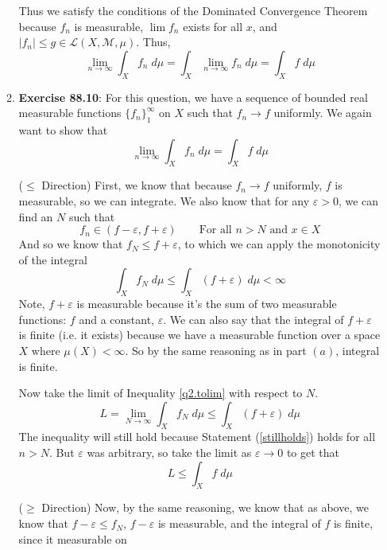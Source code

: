 \documentclass[12pt]{article}
\theoremstyle{plain}
\theoremstyle{definition}
\theoremstyle{remark}
\begin{document}
\begin{enumerate}
\begin{enumerate}
Thus we satisfy the conditions of the Dominated Convergence Theorem because $f_n$ is measurable, $\lim f_n$ exists for all $x$, and $|f_n|\leq g\in\mathscr{L}(X,\mathscr{M},\mu)$. Thus, 
\[
  \lim_{n\rightarrow\infty} \int_X f_n \; d\mu  
  = \int_X \lim_{n\rightarrow\infty} f_n \; d\mu
  = \int_X  f \; d\mu
\]

\item \textbf{Exercise 88.10}: For this question, we have a sequence of bounded real measurable functions $\{f_n\}^\infty_1$ on $X$ such that $f_n\rightarrow f$ uniformly. We again want to show that 
\begin{equation}
    \lim_{n\rightarrow\infty} \int_X f_n \; d\mu
    = \int_X f \; d\mu
\end{equation}
    
($\leq$ Direction) First, we know that because $f_n\rightarrow f$ uniformly, $f$ is measurable, so we can integrate. We also know that for any $\varepsilon>0$, we can find an $N$ such that 
\begin{equation}
    \label{stillholds}
    f_n \in (f-\varepsilon, f+\varepsilon) 
    \qquad \text{For all $n>N$ and $x\in X$}
\end{equation}
And so we know that $f_N\leq f+\varepsilon$, to which we can apply the monotonicity of the integral
\begin{equation}
    \label{q2.tolim}
    \int_X f_N \; d\mu \leq \int_X (f+\varepsilon) \; d\mu
    <\infty
\end{equation}
Note, $f+\varepsilon$ is measurable because it's the sum of two measurable functions: $f$ and a constant, $\varepsilon$. We can also say that the integral of $f+\varepsilon$ is finite (i.e. it exists) because we have a measurable function over a space $X$ where $\mu(X)<\infty$. So by the same reasoning as in part $(a)$, integral is finite.

Now take the limit of Inequality \ref{q2.tolim} with respect to $N$. 
\begin{equation}
    L=\lim_{N\rightarrow\infty}
    \int_X f_N \; d\mu \leq \int_X (f+\varepsilon) \; d\mu
\end{equation}
The inequality will still hold because Statement (\ref{stillholds}) holds for all $n>N$. But $\varepsilon$ was arbitrary, so take the limit as $\varepsilon\rightarrow0$ to get that 
\begin{equation}
    L \leq \int_X f \; d\mu
\end{equation}

($\geq$ Direction) Now, by the same reasoning, we know that as above, we know that $f - \varepsilon \leq f_N$, $f-\varepsilon$ is measurable, and the integral of $f$ is finite, since it measurable on 



\end{enumerate}
\end{enumerate}
\end{document}
